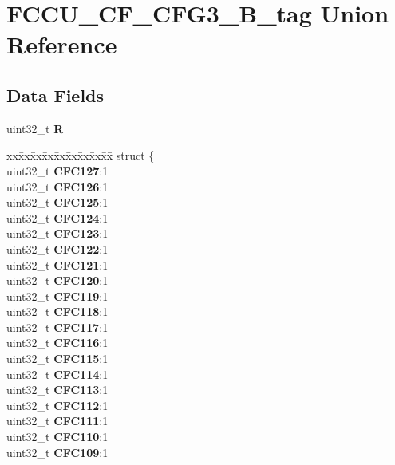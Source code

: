 \hypertarget{unionFCCU__CF__CFG3__32B__tag}{}\section{F\+C\+C\+U\+\_\+\+C\+F\+\_\+\+C\+F\+G3\+\_\+B\+\_\+tag Union Reference}
\label{unionFCCU__CF__CFG3__32B__tag}
\subsection*{Data Fields}
\begin{DoxyCompactItemize}
\item 
\mbox{\label{unionFCCU__CF__CFG3__32B__tag_ad364310d30cf453a87f54e00d02c4e1e}} 
uint32\+\_\+t {\bfseries R}
\item 
\mbox{\label{unionFCCU__CF__CFG3__32B__tag_a2648295a2dce9503cdaa91a2eadc7623}} 
\begin{tabbing}
xx\=xx\=xx\=xx\=xx\=xx\=xx\=xx\=xx\=\kill
struct \{\\
\>uint32\_t {\bfseries CFC127}:1\\
\>uint32\_t {\bfseries CFC126}:1\\
\>uint32\_t {\bfseries CFC125}:1\\
\>uint32\_t {\bfseries CFC124}:1\\
\>uint32\_t {\bfseries CFC123}:1\\
\>uint32\_t {\bfseries CFC122}:1\\
\>uint32\_t {\bfseries CFC121}:1\\
\>uint32\_t {\bfseries CFC120}:1\\
\>uint32\_t {\bfseries CFC119}:1\\
\>uint32\_t {\bfseries CFC118}:1\\
\>uint32\_t {\bfseries CFC117}:1\\
\>uint32\_t {\bfseries CFC116}:1\\
\>uint32\_t {\bfseries CFC115}:1\\
\>uint32\_t {\bfseries CFC114}:1\\
\>uint32\_t {\bfseries CFC113}:1\\
\>uint32\_t {\bfseries CFC112}:1\\
\>uint32\_t {\bfseries CFC111}:1\\
\>uint32\_t {\bfseries CFC110}:1\\
\>uint32\_t {\bfseries CFC109}:1\\

\end{tabbing}
\end{DoxyCompactItemize}
